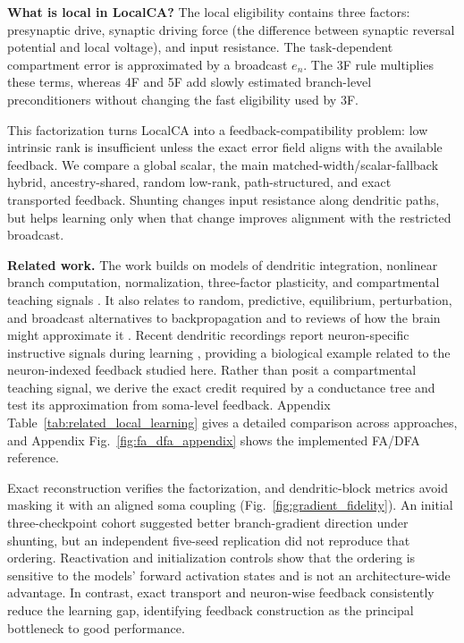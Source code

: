     \noindent\textbf{What is local in LocalCA?}
    The local eligibility contains three factors: presynaptic drive, synaptic driving force (the difference between synaptic reversal potential and local voltage), and input resistance. The task-dependent compartment error is approximated by a broadcast $e_n$. The 3F rule multiplies these terms, whereas 4F and 5F add slowly estimated branch-level preconditioners without changing the fast eligibility used by 3F.
    
    This factorization turns LocalCA into a feedback-compatibility problem: low intrinsic rank is insufficient unless the exact error field aligns with the available feedback. We compare a global scalar, the main matched-width/scalar-fallback hybrid, ancestry-shared, random low-rank, path-structured, and exact transported feedback. Shunting changes input resistance along dendritic paths, but helps learning only when that change improves alignment with the restricted broadcast.
    
    \noindent\textbf{Related work.}
    The work builds on models of dendritic integration, nonlinear branch computation, normalization, three-factor plasticity, and compartmental teaching signals \cite{koch1983nonlinear,koch1999biophysics,poirazi2003pyramidal,london2005dendritic,silver2010neuronal,carandini2012normalization,fremaux2016threefactor,urbanczik2014dendritic,guerguiev2017segregated,sacramento2018dendritic,payeur2021burst,iyer2022activedendrites}. It also relates to random, predictive, equilibrium, perturbation, and broadcast alternatives to backpropagation and to reviews of how the brain might approximate it \cite{lillicrap2016random,nokland2016dfa,lee2015dtp,scellier2017equilibrium,meulemans2021dfc,millidge2021predictive,hinton2022forward,dellaferrera2022pepita,haider2021latent,max2024backprojections,song2024prospective,whittington2019theories,lillicrap2020backprop}. Recent dendritic recordings report neuron-specific instructive signals during learning \cite{francioni2026vectorized}, providing a biological example related to the neuron-indexed feedback studied here. Rather than posit a compartmental teaching signal, we derive the exact credit required by a conductance tree and test its approximation from soma-level feedback. Appendix Table~\ref{tab:related_local_learning} gives a detailed comparison across approaches, and Appendix Fig.~\ref{fig:fa_dfa_appendix} shows the implemented FA/DFA reference.
    
    Exact reconstruction verifies the factorization, and dendritic-block metrics avoid masking it with an aligned soma coupling (Fig.~\ref{fig:gradient_fidelity}). An initial three-checkpoint cohort suggested better branch-gradient direction under shunting, but an independent five-seed replication did not reproduce that ordering. Reactivation and initialization controls show that the ordering is sensitive to the models' forward activation states and is not an architecture-wide advantage. In contrast, exact transport and neuron-wise feedback consistently reduce the learning gap, identifying feedback construction as the principal bottleneck to good performance.
    
